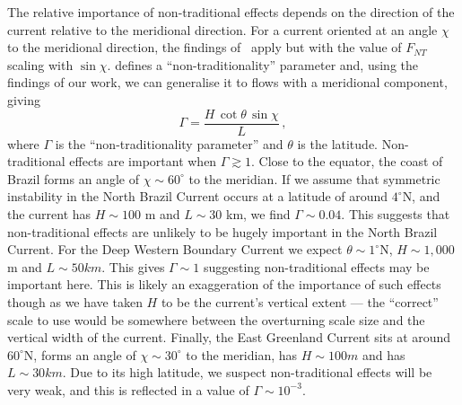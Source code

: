     The relative importance of non-traditional effects depends on the direction of the current relative to the meridional direction. For a current oriented at an angle $\chi$ to the meridional direction, the findings of~\citet{Zeitlin2018a} apply but with the value of $F_{NT}$ scaling with $\sin \chi$. \citet{Zeitlin2018a} defines a ``non-traditionality'' parameter and, using the findings of our work, we can generalise it to flows with a meridional component, giving
    \begin{equation}
        \Gamma = \frac{H\,\cot\theta\,\sin \chi}{L} \, ,
    \end{equation}
    where $\Gamma$ is the  ``non-traditionality parameter'' and $\theta$ is the latitude. Non-traditional effects are important when $\Gamma \gtrsim 1$. Close to the equator, the coast of Brazil forms an angle of $\chi \sim 60^\circ$ to the meridian. If we assume that symmetric instability in the North Brazil Current occurs at a latitude of around $4^\circ$N\footnotemark, and the current has $H\sim100$ m and $L\sim30$ km, we find $\Gamma \sim 0.04$.
    This suggests that non-traditional effects are unlikely to be hugely important in the North Brazil Current. For the Deep Western Boundary Current we expect $\theta \sim 1^\circ$N, $H\sim 1,000$ m and $L \sim 50 km$. This gives $\Gamma \sim 1$ suggesting non-traditional effects may be important here. This is likely an exaggeration of the importance of such effects though as we have taken $H$ to be the current's vertical extent --- the ``correct'' scale to use would be somewhere between the overturning scale size and the vertical width of the current. Finally, the East Greenland Current sits at around $60^\circ$N, forms an angle of $\chi \sim 30^\circ$ to the meridian, has $H \sim 100 m$ and has $L \sim 30 km$. Due to its high latitude, we suspect non-traditional effects will be very weak, and this is reflected in a value of $\Gamma \sim 10^{-3}$.

